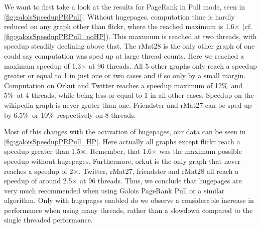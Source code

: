 We want to first take a look at the results for PageRank in Pull mode, seen in \autoref{fig:galoisSpeedupPRPull}. Without hugepages, computation time is hardly reduced on any graph other than flickr, where the reached maximum is 1.6$\times$ (cf. \autoref{fig:galoisSpeedupPRPull_noHP}). This maximum is reached at two threads, with speedup steadily declining above that.
The rMat28 is the only other graph of one could say computation was sped up at large thread counts. Here we reached a maximum speedup of 1.3$\times$ at 96 threads.
All 5 other graphs only reach a speedup greater or equal to 1 in just one or two cases and if so only by a small margin.
Computation on Orkut and Twitter reaches a speedup maximum of 12\%\ and 5\%\ at 4 threads, while being less or equal to 1 in all other cases.
Speedup on the wikipedia graph is never grater than one.
Friendster and rMat27 can be sped up by 6.5\%\ or 10\%\ respectively on 8 threads.

Most of this changes with the activation of hugepages, our data can be seen in \autoref{fig:galoisSpeedupPRPull_HP}. 
Here actually all graphs except flickr reach a speedup greater than 1.5$\times$. Remember, that 1.6$\times$ was the maximum possible speedup without hugepages.
Furthermore, orkut is the only graph that never reaches a speedup of 2$\times$.
Twitter, rMat27, friendster and rMat28 all reach a speedup of around 2.5$\times$ at 96 threads.
Thus, we conclude that hugepages are very much recommended when using Galois PageRank Pull or a similar algorithm. Only with hugepages enabled do we observe a considerable increase in performance when using many threads, rather than a slowdown compared to the single threaded performance.

